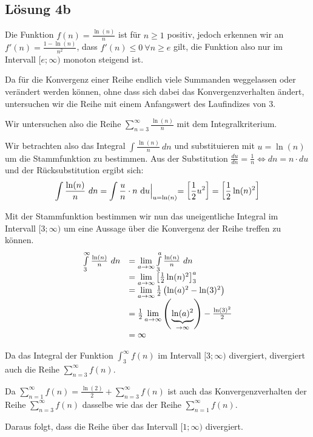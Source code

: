 \documentclass[main.tex]{subfiles}
\begin{document}
\subsection{Lösung 4b}
Die Funktion $f( n) =\frac{\ln( n)}{n}$ ist für $n\geq 1$ positiv, jedoch erkennen wir an $f'( n) =\frac{1-\ln( n)}{n^{2}}$, dass $f'( n) \leq 0\ \forall n\geq e$ gilt, die Funktion also nur im Intervall $[ e;\infty )$ monoton steigend ist.

Da für die Konvergenz einer Reihe endlich viele Summanden weggelassen oder verändert werden können, ohne dass sich dabei das Konvergenzverhalten ändert, untersuchen wir die Reihe mit einem Anfangswert des Laufindizes von $3$. 

Wir untersuchen also die Reihe $\sum _{n=3}^{\infty }\frac{\ln( n)}{n}$ mit dem Integralkriterium.

Wir betrachten also das Integral $\int \frac{\ln( n)}{n} \ dn$ und substituieren mit $u=\ln( n)$ um die Stammfunktion zu bestimmen. Aus der Substitution $\frac{du}{dn} =\frac{1}{n} \Leftrightarrow dn=n\cdotp du$ und der Rücksubstitution ergibt sich:
\begin{equation*}
    \int \frac{\ln( n)}{n} \ dn=\int \frac{u}{n} \cdotp n\ \mathrm{d} u\Bigl|_{u=\ln( n)} =\left[\frac{1}{2} u^{2}\right] =\left[\frac{1}{2}\ln( n)^{2}\right]
\end{equation*}

Mit der Stammfunktion bestimmen wir nun das uneigentliche Integral im Intervall $[ 3;\infty )$ um eine Aussage über die Konvergenz der Reihe treffen zu können.
\begin{equation*}
    \begin{array}{ c l }
    \int\limits _{3}^{\infty }\frac{\ln( n)}{n} \ dn & =\lim\limits _{a\rightarrow \infty }\int\limits _{3}^{a}\frac{\ln( n)}{n} \ dn\\
    & =\lim\limits _{a\rightarrow \infty }\left[\frac{1}{2}\ln( n)^{2}\right]_{3}^{a}\\
    & =\lim\limits _{a\rightarrow \infty }\frac{1}{2}\left(\ln( a)^{2} -\ln( 3)^{2}\right)\\
    & =\frac{1}{2}\lim\limits _{a\rightarrow \infty }\left(\underbrace{\ln( a)^{2}}_{\rightarrow \infty }\right) -\frac{\ln( 3)^{2}}{2}\\
    & =\infty 
    \end{array}
\end{equation*}

Da das Integral der Funktion $\int _{3}^{\infty } f( n)$ im Intervall $[ 3;\infty )$ divergiert, divergiert auch die Reihe $\sum _{n=3}^{\infty } f( n)$.

Da $\sum _{n=1}^{\infty } f( n) =\frac{\ln( 2)}{2} +\sum _{n=3}^{\infty } f( n)$ ist auch das Konvergenzverhalten der Reihe $\sum _{n=3}^{\infty } f( n)$ dasselbe wie das der Reihe $\sum _{n=1}^{\infty } f( n)$.

Daraus folgt, dass die Reihe über das Intervall $[ 1;\infty )$ divergiert.
\end{document}
